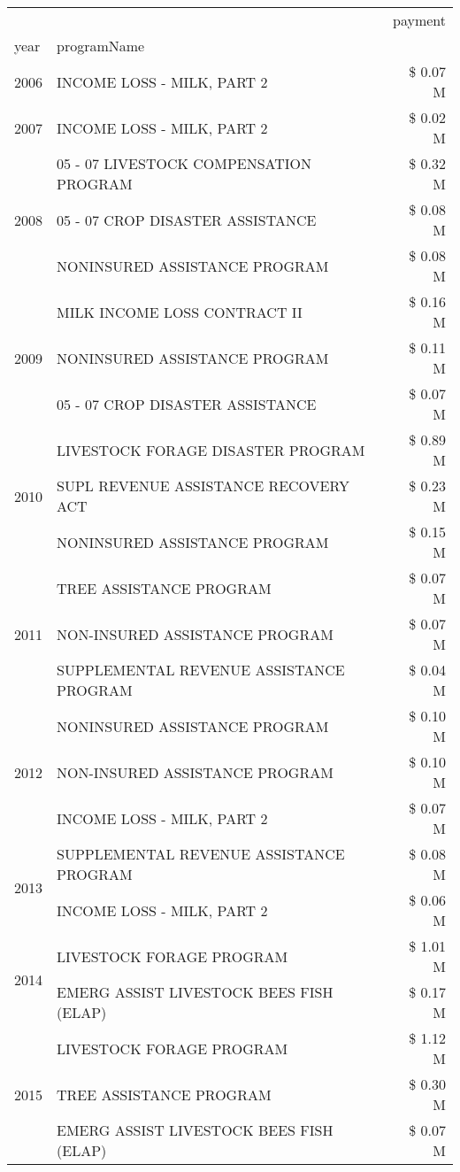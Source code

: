 \begin{tabular}{llr}
\toprule
 &  & payment \\
year & programName &  \\
\midrule
2006 & INCOME LOSS - MILK, PART 2 & \$ 0.07 M \\
\cline{1-3}
2007 & INCOME LOSS - MILK, PART 2 & \$ 0.02 M \\
\cline{1-3}
\multirow[t]{3}{*}{2008} & 05 - 07 LIVESTOCK COMPENSATION PROGRAM & \$ 0.32 M \\
 & 05 - 07 CROP DISASTER ASSISTANCE & \$ 0.08 M \\
 & NONINSURED ASSISTANCE PROGRAM & \$ 0.08 M \\
\cline{1-3}
\multirow[t]{3}{*}{2009} & MILK INCOME LOSS CONTRACT II & \$ 0.16 M \\
 & NONINSURED ASSISTANCE PROGRAM & \$ 0.11 M \\
 & 05 - 07 CROP DISASTER ASSISTANCE & \$ 0.07 M \\
\cline{1-3}
\multirow[t]{3}{*}{2010} & LIVESTOCK FORAGE DISASTER  PROGRAM & \$ 0.89 M \\
 & SUPL REVENUE ASSISTANCE RECOVERY ACT & \$ 0.23 M \\
 & NONINSURED ASSISTANCE PROGRAM & \$ 0.15 M \\
\cline{1-3}
\multirow[t]{3}{*}{2011} & TREE ASSISTANCE PROGRAM & \$ 0.07 M \\
 & NON-INSURED ASSISTANCE PROGRAM & \$ 0.07 M \\
 & SUPPLEMENTAL REVENUE ASSISTANCE PROGRAM & \$ 0.04 M \\
\cline{1-3}
\multirow[t]{3}{*}{2012} & NONINSURED ASSISTANCE PROGRAM & \$ 0.10 M \\
 & NON-INSURED ASSISTANCE PROGRAM & \$ 0.10 M \\
 & INCOME LOSS - MILK, PART 2 & \$ 0.07 M \\
\cline{1-3}
\multirow[t]{2}{*}{2013} & SUPPLEMENTAL REVENUE ASSISTANCE PROGRAM & \$ 0.08 M \\
 & INCOME LOSS - MILK, PART 2 & \$ 0.06 M \\
\cline{1-3}
\multirow[t]{2}{*}{2014} & LIVESTOCK FORAGE PROGRAM & \$ 1.01 M \\
 & EMERG ASSIST LIVESTOCK BEES FISH (ELAP) & \$ 0.17 M \\
\cline{1-3}
\multirow[t]{3}{*}{2015} & LIVESTOCK FORAGE PROGRAM & \$ 1.12 M \\
 & TREE ASSISTANCE PROGRAM & \$ 0.30 M \\
 & EMERG ASSIST LIVESTOCK BEES FISH (ELAP) & \$ 0.07 M \\

\end{tabular}
